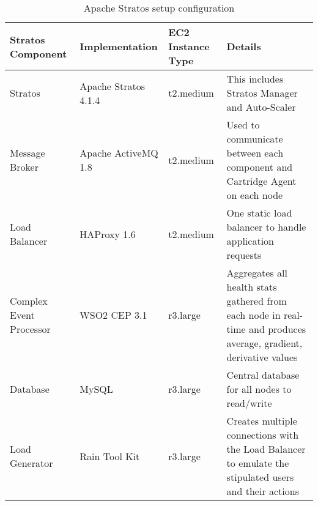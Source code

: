\begin{table}[h!]
\centering
\caption{Apache Stratos setup configuration}
\label{tab:stratos_config}
    \begin{tabular}{ | p{1cm} | p{2cm} | p{1cm}| p{3cm}|}
    \hline
    Stratos Component & Implementation & EC2 Instance Type & Details \\ \hline
    Stratos & Apache Stratos 4.1.4 & t2.medium & This includes Stratos Manager and Auto-Scaler \\ \hline
    
    Message Broker & Apache ActiveMQ 1.8 & t2.medium & Used to communicate between each component and Cartridge Agent on each node \\ \hline
    
    Load Balancer & HAProxy 1.6 & t2.medium & One static load balancer to handle application requests \\    \hline
    
    Complex Event Processor & WSO2 CEP 3.1 & r3.large & Aggregates all health stats gathered from each node in real-time and produces average, gradient, derivative values \\    \hline
    
    Database & MySQL & r3.large & Central database for all nodes to read/write \\    \hline
    
    Load Generator & Rain Tool Kit & r3.large & Creates multiple connections with the Load Balancer to emulate the stipulated users and their actions \\    \hline
    \end{tabular}
    
\end{table}